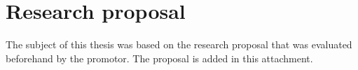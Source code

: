 \documentclass[fleqn,a4paper,12pt]{book}
\begin{document}


\inserttitlepage

\usechapterimagefalse



\pagestyle{empty} %
\tableofcontents %
\cleardoublepage %
\pagestyle{fancy} %











%
%



\appendix


\chapter{Research proposal}

The subject of this thesis was based on the research proposal that was evaluated beforehand by the promotor. The proposal is added in this attachment.






\printbibliography[heading=bibintoc]
\end{document}
